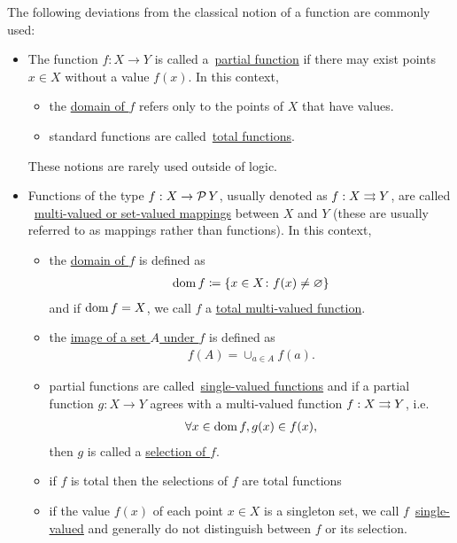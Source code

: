 \begin{definition}[Functions]
  The following deviations from the classical notion of a function are commonly used:
  \begin{itemize}
    \item The function $f: X \to Y$ is called a~\uline{partial function} if there may exist points $x \in X$ without a value $f(x)$. In this context,
    \begin{itemize}
      \item the \uline{domain of $f$} refers only to the points of $X$ that have values.
      \item standard functions are called~\uline{total functions}.
    \end{itemize}

    These notions are rarely used outside of logic.

    \item Functions of the type $f: X \to \operatorname{\mathcal P} Y$, usually denoted as $f: X \rightrightarrows Y$, are called ~\uline{multi-valued or set-valued mappings} between $X$ and $Y$ (these are usually referred to as mappings rather than functions). In this context,
    \begin{itemize}
      \item the \uline{domain of $f$} is defined as
      \begin{align*}
        \operatorname{dom} f \coloneqq \{ x \in X \colon f(x) \neq \varnothing \}
      \end{align*}
      and if $\operatorname{dom} f = X$, we call $f$ a \uline{total multi-valued function}.

      \item the \uline{image of a set $A$ under $f$} is defined as
      \begin{align*}
        f(A) = \cup_{a \in A} f(a).
      \end{align*}

      \item partial functions are called~\uline{single-valued functions} and if a partial function $g: X \to Y$ agrees with a multi-valued function $f: X \rightrightarrows Y$, i.e.
      \begin{align*}
        \forall x \in \operatorname{dom} f, g(x) \in f(x),
      \end{align*}
      then $g$ is called a \uline{selection of $f$}.

      \item if $f$ is total then the selections of $f$ are total functions

      \item if the value $f(x)$ of each point $x \in X$ is a singleton set, we call $f$~\uline{single-valued} and generally do not distinguish between $f$ or its selection.
    \end{itemize}
  \end{itemize}
\end{definition}


